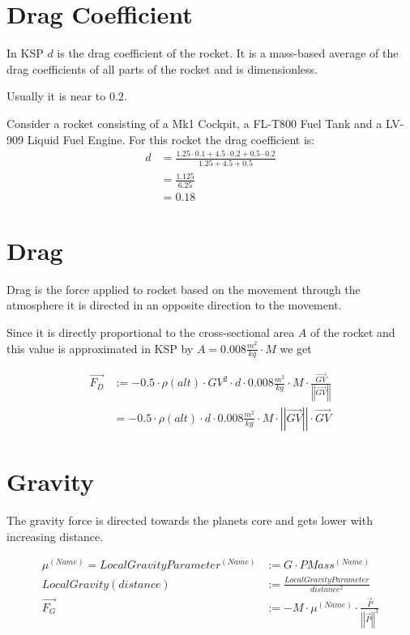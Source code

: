 \documentclass[11pt]{article}
\newcommand{\oa}[1]{\overrightarrow{#1}}
\newcommand{\F}[1]{\oa{F_{#1}}}
\newcommand{\Pos}{\oa{P}}
\newcommand{\absvec}[1]{\left|\left|{#1}\right|\right|}
\begin{document}
\section{Drag Coefficient}

In KSP $d$ is the drag coefficient of the rocket. It is a mass-based
average of the drag coefficients of all parts of the rocket and is
dimensionless.

Usually it is near to $0.2$.

Consider a rocket consisting of a Mk1 Cockpit, a FL-T800 Fuel Tank and
a LV-909 Liquid Fuel Engine. For this rocket the drag coefficient is:
\begin{align}
  d &= \frac{1.25 \cdot 0.1 + 4.5 \cdot 0.2 + 0.5 \cdot 0.2}{ 1.25 + 4.5 + 0.5 }\nonumber\\
  &= \frac{1.125}{6.25}\nonumber\\
  &= 0.18\nonumber
\end{align}

\section{Drag}

Drag is the force applied to rocket based on the movement through the
atmosphere it is directed in an opposite direction to the movement.

Since it is directly proportional to the cross-sectional area $A$ of
the rocket and this value is approximated in KSP by $A = 0.008
\frac{m^2}{kg} \cdot M$ we get

\begin{align}
  \F{D} &:= - 0.5 \cdot \rho(alt)\cdot GV^2\cdot d \cdot 0.008\frac{m^2}{kg} \cdot M \cdot \frac{\oa{GV}}{\absvec{\oa{GV}}} \nonumber\\
  &= - 0.5 \cdot \rho(alt)\cdot d \cdot 0.008\frac{m^2}{kg} \cdot M \cdot \absvec{\oa{GV}} \cdot \oa{GV}
\end{align}

\section{Gravity}

The gravity force is directed towards the planets core and gets lower
with increasing distance.

\begin{align}
  \mu^{(Name)} = LocalGravityParameter^{(Name)} &:= G \cdot PMass^{(Name)} \nonumber\\
  LocalGravity(distance) &:= \frac{LocalGravityParameter}{distance^2}\nonumber\\
  \F{G} &:= - M \cdot \mu^{(Name)}\cdot\frac{\Pos}{\absvec{\Pos}^3}
\end{align}
\end{document}
